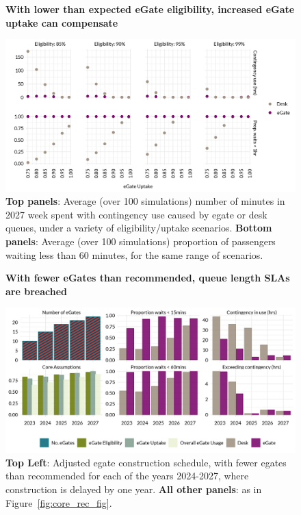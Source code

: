 \documentclass[10pt]{article}
\newcommand*{\figuretitle}[1]{%
    {\centering%
    \textbf{#1}%
    \par\medskip}%
}
\begin{document}
\begin{figure}[!ht]
    \centering
    \figuretitle{With lower than expected eGate eligibility, increased eGate uptake can compensate}
    \includegraphics[width=\textwidth]{figures/robustness_fig.png}
     \caption{\textbf{Top panels}: Average (over 100 simulations) number of minutes in 2027 week spent with contingency use caused by \gls{egate} or desk queues, under a variety of eligibility/uptake scenarios. \textbf{Bottom panels}: Average (over 100 simulations) proportion of passengers waiting less than 60 minutes, for the same range of scenarios.} \label{fig:robustness_fig}
\end{figure}

\begin{figure}[!h]
    \centering
    \figuretitle{With fewer eGates than recommended, queue length SLAs are breached}
    \includegraphics[width=\textwidth]{figures/minus_core_rec_fig.png}
     \caption{\textbf{Top Left}: Adjusted \gls{egate} construction schedule, with fewer \glspl{egate} than recommended for each of the years 2024-2027, where construction is delayed by one year. \textbf{All other panels}: as in Figure~\ref{fig:core_rec_fig}.} \label{fig:minus_core_rec_fig}
\end{figure}
\end{document}
